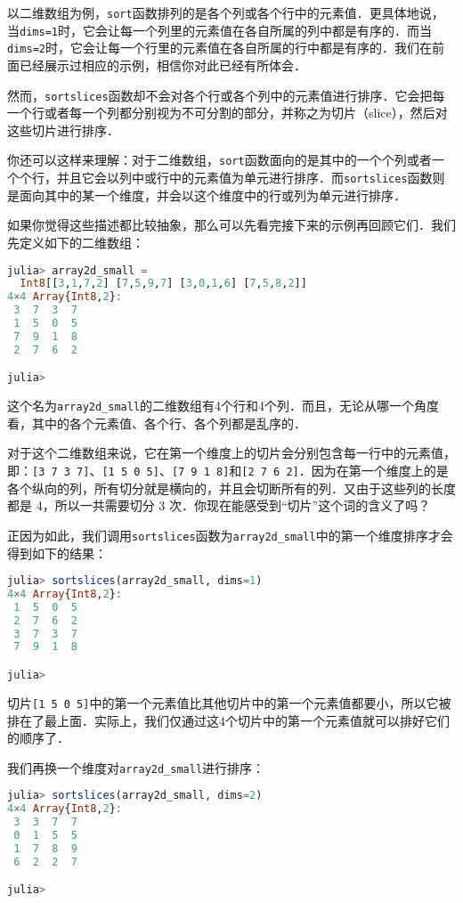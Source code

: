 以二维数组为例，\verb|sort|函数排列的是各个列或各个行中的元素值．更具体地说，当\verb|dims=1|时，它会让每一个列里的元素值在各自所属的列中都是有序的．而当\verb|dims=2|时，它会让每一个行里的元素值在各自所属的行中都是有序的．我们在前面已经展示过相应的示例，相信你对此已经有所体会．

然而，\verb|sortslices|函数却不会对各个行或各个列中的元素值进行排序．它会把每一个行或者每一个列都分别视为不可分割的部分，并称之为切片（slice），然后对这些切片进行排序．

你还可以这样来理解：对于二维数组，\verb|sort|函数面向的是其中的一个个列或者一个个行，并且它会以列中或行中的元素值为单元进行排序．而\verb|sortslices|函数则是面向其中的某一个维度，并会以这个维度中的行或列为单元进行排序．

如果你觉得这些描述都比较抽象，那么可以先看完接下来的示例再回顾它们．我们先定义如下的二维数组：

\begin{lstlisting}[language=julia]
julia> array2d_small = 
  Int8[[3,1,7,2] [7,5,9,7] [3,0,1,6] [7,5,8,2]]
4×4 Array{Int8,2}:
 3  7  3  7
 1  5  0  5
 7  9  1  8
 2  7  6  2

julia> 
\end{lstlisting}

这个名为\verb|array2d_small|的二维数组有4个行和4个列．而且，无论从哪一个角度看，其中的各个元素值、各个行、各个列都是乱序的．

对于这个二维数组来说，它在第一个维度上的切片会分别包含每一行中的元素值，即：\verb|[3 7 3 7]|、\verb|[1 5 0 5]|、\verb|[7 9 1 8]|和\verb|[2 7 6 2]|．因为在第一个维度上的是各个纵向的列，所有切分就是横向的，并且会切断所有的列．又由于这些列的长度都是 4，所以一共需要切分 3 次．你现在能感受到“切片”这个词的含义了吗？

正因为如此，我们调用\verb|sortslices|函数为\verb|array2d_small|中的第一个维度排序才会得到如下的结果：

\begin{lstlisting}[language=julia]
julia> sortslices(array2d_small, dims=1)
4×4 Array{Int8,2}:
 1  5  0  5
 2  7  6  2
 3  7  3  7
 7  9  1  8

julia> 
\end{lstlisting}

切片\verb|[1 5 0 5]|中的第一个元素值比其他切片中的第一个元素值都要小，所以它被排在了最上面．实际上，我们仅通过这4个切片中的第一个元素值就可以排好它们的顺序了．

我们再换一个维度对\verb|array2d_small|进行排序：

\begin{lstlisting}[language=julia]
julia> sortslices(array2d_small, dims=2)
4×4 Array{Int8,2}:
 3  3  7  7
 0  1  5  5
 1  7  8  9
 6  2  2  7

julia> 
\end{lstlisting}


